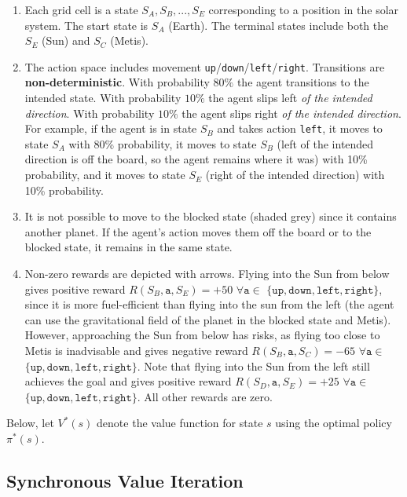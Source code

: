 \documentclass[11pt,addpoints,answers]{exam}
\begin{document}
\begin{questions}
\begin{enumerate}
    \item Each grid cell is a state $S_A, S_B,..., S_E$ corresponding to a position in the solar system. The start state is $S_A$ (Earth). The terminal states include both the $S_E$ (Sun) and $S_C$ (Metis).
    \item The action space includes movement \texttt{up}/\texttt{down}/\texttt{left}/\texttt{right}. Transitions are \textbf{non-deterministic}. With probability $80\%$ the agent transitions to the intended state. With probability $10\%$ the agent slips left \emph{of the intended direction}. With probability $10\%$ the agent slips right \emph{of the intended direction}. For example, if the agent is in state $S_B$ and takes action \texttt{left},  it moves to state $S_A$ with 80\% probability, it moves to state $S_B$ (left of the intended direction is off the board, so the agent remains where it was) with 10\% probability, and it moves to state $S_E$ (right of the intended direction)  with 10\% probability.
    \item It is not possible to move to the blocked state (shaded grey) since it contains another planet. If the agent's action moves them off the board or to the blocked state, it remains in the same state.
    \item Non-zero rewards are depicted with arrows. Flying into the Sun from below gives positive reward $R(S_B, \texttt{a}, S_E) = +50$ $\forall \texttt{a} \in$ $\{\texttt{up},\texttt{down},\texttt{left},\texttt{right}\}$, since it is more fuel-efficient than flying into the sun from the left (the agent can use the gravitational field of the planet in the blocked state and Metis). However, approaching the Sun from below has risks, as flying too close to Metis is inadvisable and gives negative reward $R(S_B, \texttt{a}, S_C) = -65$ $\forall \texttt{a} \in$ $\{\texttt{up},\texttt{down},\texttt{left},\texttt{right}\}$. Note that flying into the Sun from the left still achieves the goal and gives positive reward $R(S_D, \texttt{a}, S_E) = +25$ $\forall \texttt{a} \in$ $\{\texttt{up},\texttt{down},\texttt{left},\texttt{right}\}$. All other rewards are zero.
\end{enumerate}

    
Below, let $V^*(s)$ denote the value function for state $s$ using the optimal policy $\pi^*(s)$.

\vspace{1em}

\subsection{Synchronous Value Iteration}


\end{questions}
\end{document}
